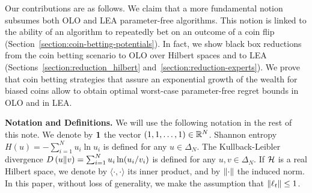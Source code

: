 Our contributions are as follows. We claim that a more fundamental notion
subsumes both \ac{OLO} and \ac{LEA} parameter-free algorithms. This notion is
linked to the ability of an algorithm to repeatedly bet on an outcome of a coin
flip (Section~\ref{section:coin-betting-potentials}). In fact, we show black
box reductions from the coin betting scenario to \ac{OLO} over Hilbert spaces
and to \ac{LEA} (Sections~\ref{section:reduction_hilbert}
and~\ref{section:reduction-experts}).  We prove that coin betting strategies
that assure an exponential growth of the wealth for biased coins allow to
obtain optimal worst-case parameter-free regret bounds in \ac{OLO} and in
\ac{LEA}.

\noindent\textbf{Notation and Definitions.}
We will use the following notation in the rest of this note. We denote by
$\mathbf{1}$ the vector $(1,1,\dots,1) \in \mathbb{R}^N$. Shannon entropy $H(u) =
-\sum_{i=1}^N u_i \ln u_i$ is defined for any $u \in \Delta_N$.  The
Kullback-Leibler divergence $D\left({u}\middle\|{v}\right) = \sum_{i=1}^N u_i \ln(u_i/v_i)$ is
defined for any $u,v \in \Delta_N$. If $\mathcal{H}$ is a real Hilbert space, we denote
by $\langle \cdot, \cdot \rangle$ its inner product, and by $\left\|{\cdot}\right\|$ the
induced norm. In this paper, without loss of generality, we make the assumption
that $\left\|{\ell_t}\right\| \le 1$.
